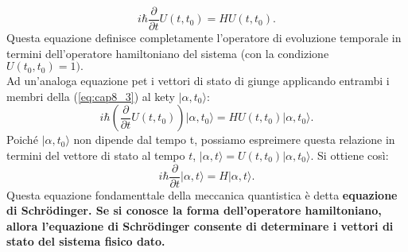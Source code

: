 \documentclass[a4paper,12pt,oneside]{book}
\begin{document}
\begin{equation}
i\hbar \frac{\partial}{\partial t} U (t, t_0)= H U(t,t_0).
\label{eq:cap8_3}
\end{equation}
Questa equazione definisce completamente l'operatore di evoluzione temporale in termini dell'operatore hamiltoniano del sistema (con la condizione $U(t_0,t_0)=1).$\\
Ad un'analoga equazione pet i vettori di stato di giunge applicando entrambi i membri della (\ref{eq:cap8_3}) al kety $\vert \alpha, t_0\rangle$:
\begin{equation}
i\hbar \left( \frac{\partial}{\partial t} U (t,t_0) \right) \vert \alpha, t_0\rangle= H U(t, t_0)\vert \alpha, t_0\rangle.
\end{equation}
Poiché $\vert \alpha, t_0\rangle$ non dipende dal tempo t, possiamo espreimere questa relazione in termini del vettore di stato al tempo $t$, $\vert \alpha, t\rangle= U(t,t_0)\vert \alpha, t_0\rangle$. Si ottiene così:
\begin{equation}
i\hbar \frac{\partial}{\partial t} \vert \alpha, t \rangle = H \vert \alpha, t \rangle.
\end{equation}
Questa equazione fondamenttale della meccanica quantistica è detta \textbf{equazione di Schr\"{o}dinger. Se si conosce la forma dell'operatore hamiltoniano, allora l'equazione di Schr\"{o}dinger consente di determinare i vettori di stato del sistema fisico dato.}
\end{document}
